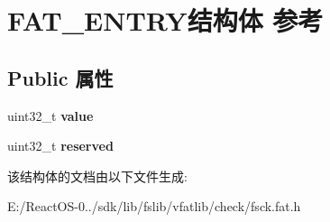 \hypertarget{struct_f_a_t___e_n_t_r_y}{}\section{F\+A\+T\+\_\+\+E\+N\+T\+R\+Y结构体 参考}
\label{struct_f_a_t___e_n_t_r_y}
\subsection*{Public 属性}
\begin{DoxyCompactItemize}
\item 
\mbox{\label{struct_f_a_t___e_n_t_r_y_a0fadf2fcc3a2a4e59b4929c942c88d59}} 
uint32\+\_\+t {\bfseries value}
\item 
\mbox{\label{struct_f_a_t___e_n_t_r_y_a19841396f3c20336c0128869eeb8f7cb}} 
uint32\+\_\+t {\bfseries reserved}
\end{DoxyCompactItemize}


该结构体的文档由以下文件生成\+:\begin{DoxyCompactItemize}
\item 
E\+:/\+React\+O\+S-\/0../sdk/lib/fslib/vfatlib/check/fsck.\+fat.\+h\end{DoxyCompactItemize}
